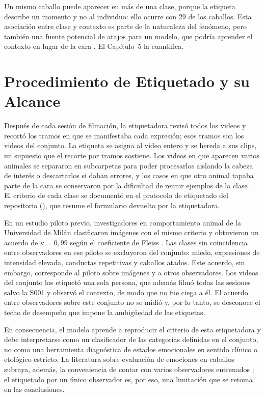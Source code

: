 Un mismo caballo puede aparecer en más de una clase, porque la etiqueta describe un momento y no al individuo: ello ocurre con 29 de los \CaballosTotal{} caballos. Esta asociación entre clase y contexto es parte de la naturaleza del fenómeno, pero también una fuente potencial de atajos para un modelo, que podría aprender el contexto en lugar de la cara \parencite{geirhos2020}. El Capítulo~5 la cuantifica.

\section{Procedimiento de Etiquetado y su Alcance}
Después de cada sesión de filmación, la etiquetadora revisó todos los videos y recortó los tramos en que se manifestaba cada expresión; esos tramos son los videos del conjunto. La etiqueta se asigna al video entero y se hereda a sus clips, un supuesto que el recorte por tramos sostiene. Los videos en que aparecen varios animales se separaron en subcarpetas para poder procesarlos aislando la cabeza de interés o descartarlos si daban errores, y los casos en que otro animal tapaba parte de la cara se conservaron por la dificultad de reunir ejemplos de la clase . El criterio de cada clase se documentó en el protocolo de etiquetado del repositorio (), que resume el formulario devuelto por la etiquetadora.

En un estudio piloto previo, investigadores en comportamiento animal de la Universidad de Milán clasificaron imágenes con el mismo criterio y obtuvieron un acuerdo de $\kappa = 0{,}99$ según el coeficiente de Fleiss \parencite{fleiss1971}. Las clases sin coincidencia entre observadores en ese piloto se excluyeron del conjunto: miedo, expresiones de intensidad elevada, conductas repetitivas y caballos atados. Este acuerdo, sin embargo, corresponde al piloto sobre imágenes y a otros observadores. Los videos del conjunto los etiquetó una sola persona, que además filmó todas las sesiones salvo la S001 y observó el contexto, de modo que no fue ciega a él. El acuerdo entre observadores sobre este conjunto no se midió y, por lo tanto, se desconoce el techo de desempeño que impone la ambigüedad de las etiquetas.

En consecuencia, el modelo aprende a reproducir el criterio de esta etiquetadora y debe interpretarse como un clasificador de las categorías definidas en el conjunto, no como una herramienta diagnóstica de estados emocionales en sentido clínico o etológico estricto. La literatura sobre evaluación de emociones en caballos subraya, además, la conveniencia de contar con varios observadores entrenados \parencite{hintze2017}; el etiquetado por un único observador es, por eso, una limitación que se retoma en las conclusiones.
